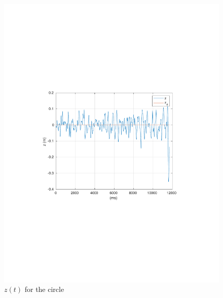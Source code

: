 \begin{frame}
	\begin{figure}[!htb]
		\centering
		\includegraphics[scale=.7,trim={3.5cm 8cm 4cm 8cm},clip]{figuras/CROB_Fuzzy_vel01_a05_circleXY/z.pdf}
		\caption{$z(t)$ for the circle}
		\label{fig:crob_circ_z}
	\end{figure}
\end{frame}
